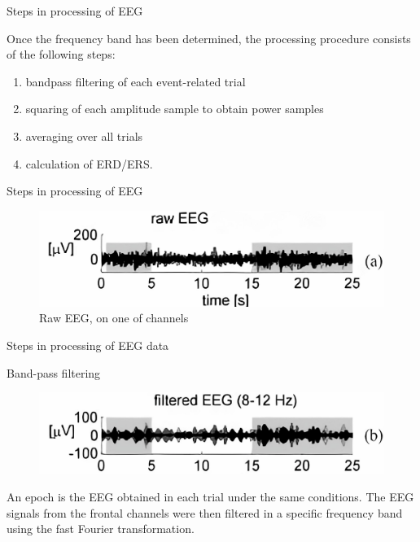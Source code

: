 \documentclass{beamer}
\begin{document}
\begin{frame}
{\centerline{Steps in processing of EEG}}

 Once the frequency band has been determined, the processing procedure consists of the following steps: 
 \begin{enumerate}
    \item bandpass filtering of each event-related trial
    \item squaring of each amplitude sample to obtain power samples
    \item averaging over all trials
    \item calculation of ERD/ERS.
 \end{enumerate}
    
\end{frame}

\begin{frame}
{\centerline{Steps in processing of EEG}}
 \begin{figure}
     \centering
     \includegraphics[width=\linewidth]{P2023.AIBCCSS.BrainSignals/Raw EEG.jpg}
     \caption{Raw EEG, on one of channels}
 \end{figure}
\end{frame}


\begin{frame}
{\centerline{Steps in processing of EEG data}}
{\centerline{Band-pass filtering}}
\begin{figure}
    \centering
    \includegraphics[width=\linewidth]{P2023.AIBCCSS.BrainSignals/banpass filtering.jpg}
\end{figure}
    An epoch is the EEG obtained in each trial under the same conditions. The EEG signals from the frontal channels were then filtered in a specific frequency band using the fast Fourier transformation.
\end{frame}
\end{document}
